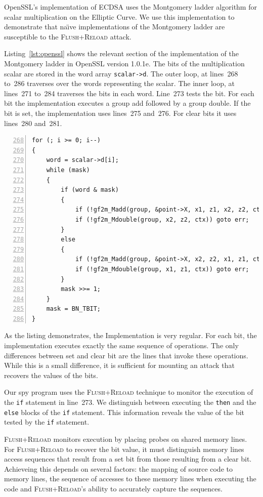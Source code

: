 \documentclass{llncs}
\begin{document}
OpenSSL's implementation of ECDSA uses the Montgomery ladder algorithm for scalar multiplication
on the Elliptic Curve.
We use this implementation to demonstrate that na{\"\i}ve implementations of the Montgomery ladder are
susceptible to the \textsc{Flush+Reload} attack.

Listing~\ref{lst:openssl} shows the relevant section of the implementation of the Montgomery ladder in OpenSSL version 1.0.1e.
The bits of the multiplication scalar are stored in the word array \texttt{scalar->d}.
The outer loop, at lines~268 to~286 traverses over the words representing the scalar.
The inner loop, at lines~271 to~284 traverses the bits in each word.
Line~273 tests the bit. 
For each bit the implementation executes a group add followed by a group double.
If the bit is set, the implementation uses lines~275 and~276.
For clear bits it uses lines~280 and~281.

\begin{lstlisting}[numbers=left,firstnumber=268,float=htb,caption=OpenSSL Implementation of the Montgomery Ladder,label=lst:openssl]
for (; i >= 0; i--)
{
    word = scalar->d[i];
    while (mask)
    {
        if (word & mask)
        {
            if (!gf2m_Madd(group, &point->X, x1, z1, x2, z2, ctx)) goto err;
            if (!gf2m_Mdouble(group, x2, z2, ctx)) goto err;
        }
        else
        {
            if (!gf2m_Madd(group, &point->X, x2, z2, x1, z1, ctx)) goto err;
            if (!gf2m_Mdouble(group, x1, z1, ctx)) goto err;
        }
        mask >>= 1;
    }
    mask = BN_TBIT;
}
\end{lstlisting}

As the listing demonstrates, the Implementation is very regular.
For each bit, the implementation executes exactly the same sequence of operations.
The only differences between set and clear bit are the lines that invoke these operations.
While this is a small difference, it is sufficient for mounting an attack that recovers 
the values of the bits.


Our spy program uses the \textsc{Flush+Reload} technique to monitor the execution of the \texttt{if}
statement in line~273.
We distinguish between executing the \texttt{then} and the \texttt{else} blocks of the \texttt{if}
statement.
This information reveals the value of the bit tested by the \texttt{if} statement.

\textsc{Flush+Reload} monitors execution by placing probes on shared memory lines.
For \textsc{Flush+Reload} to recover the bit value, it must distinguish memory lines access sequences
that result from a set bit from those resulting from a clear bit.
Achieveing this depends on several factors: the mapping of source code to memory lines, 
the sequence of accesses to these memory lines when executing the code and 
\textsc{Flush+Reload}'s ability to accurately capture the sequences.
\end{document}
